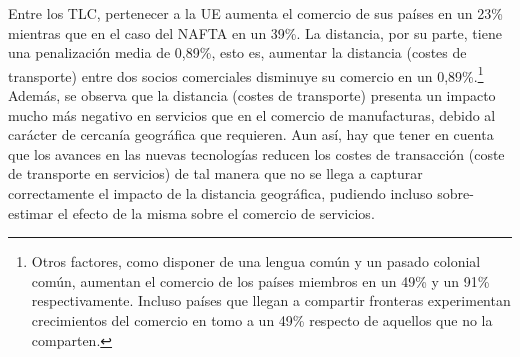 \documentclass[10pt,a4paper]{article}
\begin{document}
Entre los TLC, pertenecer a la UE aumenta el comercio de sus países en un 23\% mientras que en el caso del NAFTA en un 39\%. La distancia, por su parte, tiene una penalización media de 0,89\%, esto es, aumentar la distancia (costes de transporte) entre dos socios comerciales disminuye su comercio en un 0,89\%.\footnote{%
    Otros factores, como disponer de una lengua común y un pasado colonial común, aumentan el comercio de los países miembros en un 49\% y un 91\% respectivamente. Incluso países que llegan a compartir fronteras experimentan crecimientos del comercio en tomo a un 49\% respecto de aquellos que no la comparten.
} Además, se observa que la distancia (costes de transporte) presenta un impacto mucho más negativo en servicios que en el comercio de manufacturas, debido al carácter de cercanía geográfica que requieren. Aun así, hay que tener en cuenta que los avances en las nuevas tecnologías reducen los costes de transacción (coste de transporte en servicios) de tal manera que no se llega a capturar correctamente el impacto de la distancia geográfica, pudiendo incluso sobre-estimar el efecto de la misma sobre el comercio de servicios.
\end{document}
